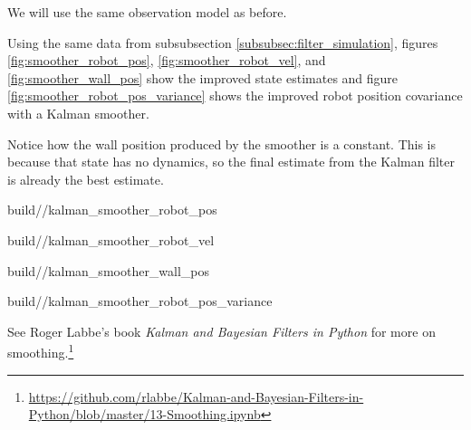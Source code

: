 We will use the same observation model as before.

Using the same data from subsubsection \ref{subsubsec:filter_simulation},
figures \ref{fig:smoother_robot_pos}, \ref{fig:smoother_robot_vel}, and
\ref{fig:smoother_wall_pos} show the improved \gls{state} estimates and figure
\ref{fig:smoother_robot_pos_variance} shows the improved robot position
covariance with a Kalman smoother.

Notice how the wall position produced by the smoother is a constant. This is
because that \gls{state} has no dynamics, so the final estimate from the Kalman
filter is already the best estimate.
\begin{svg}{build/\chapterpath/kalman_smoother_robot_pos}
  \caption{Robot position with Kalman smoother}
  \label{fig:smoother_robot_pos}
\end{svg}
\begin{svg}{build/\chapterpath/kalman_smoother_robot_vel}
  \caption{Robot velocity with Kalman smoother}
  \label{fig:smoother_robot_vel}
\end{svg}
\begin{svg}{build/\chapterpath/kalman_smoother_wall_pos}
  \caption{Wall position with Kalman smoother}
  \label{fig:smoother_wall_pos}
\end{svg}
\begin{svg}{build/\chapterpath/kalman_smoother_robot_pos_variance}
  \caption{Robot position variance with Kalman smoother}
  \label{fig:smoother_robot_pos_variance}
\end{svg}

See Roger Labbe's book \textit{Kalman and Bayesian Filters in Python} for more
on
smoothing.\footnote{\url{https://github.com/rlabbe/Kalman-and-Bayesian-Filters-in-Python/blob/master/13-Smoothing.ipynb}}
